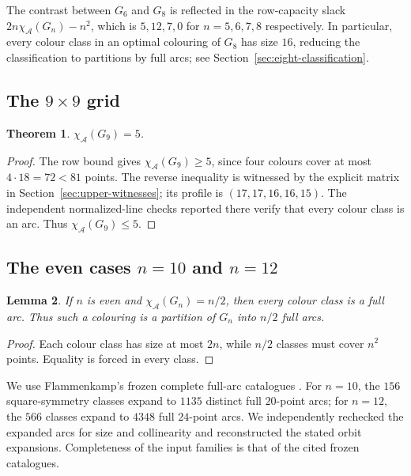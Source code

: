 \documentclass[11pt]{article}
\newtheorem{theorem}{Theorem}
\newtheorem{lemma}[theorem]{Lemma}
\theoremstyle{definition}
\theoremstyle{remark}
\renewcommand{\ge}{\geqslant}
\renewcommand{\le}{\leqslant}
\begin{document}
The contrast between \(G_6\) and \(G_8\) is reflected in the row-capacity
slack \(2n\chi_{\mathcal A}(G_n)-n^2\), which  is \(5,12,7,0\) for \(n=5,6,7,8\) respectively.  In
particular, every colour class in an optimal colouring of \(G_8\) has size
\(16\), reducing the classification to partitions by full arcs; see
Section~\ref{sec:eight-classification}.

\subsection{The \texorpdfstring{\(9\times9\)}{9 x 9} grid}

\begin{theorem}\label{thm:nine}
\(\chi_{\mathcal{A}}(G_{9})=5\).
\end{theorem}

\begin{proof}
The row bound gives \(\chi_{\mathcal{A}}(G_{9})\ge5\), since four colours cover at most
\(4\cdot18=72<81\) points.  The reverse inequality is witnessed by the
explicit matrix in Section~\ref{sec:upper-witnesses}; its profile is \((17,17,16,16,15)\).  The independent normalized-line checks reported there verify that every colour
class is an arc.  Thus \(\chi_{\mathcal A}(G_9)\le5\).
\end{proof}

\subsection{The even cases \texorpdfstring{\(n=10\) and \(n=12\)}{n=10 and n=12}}

\begin{lemma}\label{lem:even-partition}
If \(n\) is even and \(\chi_{\mathcal{A}}(G_n)=n/2\), then every colour class is a full arc.
Thus such a colouring is a partition of \(G_n\) into \(n/2\) full arcs.
\end{lemma}

\begin{proof}
Each colour class has size at most \(2n\), while \(n/2\) classes must cover
\(n^2\) points.  Equality is forced in every class.
\end{proof}

We use Flammenkamp's frozen complete full-arc catalogues
\cite{FlammenkampCatalogue}.  For \(n=10\), the \(156\) square-symmetry
classes expand to \(1135\) distinct full \(20\)-point arcs; for \(n=12\),
the \(566\) classes expand to \(4348\) full \(24\)-point arcs.  We independently
rechecked the expanded arcs for size and collinearity and reconstructed the
stated orbit expansions.  Completeness of the input families is that of the
cited frozen catalogues.
\end{document}
